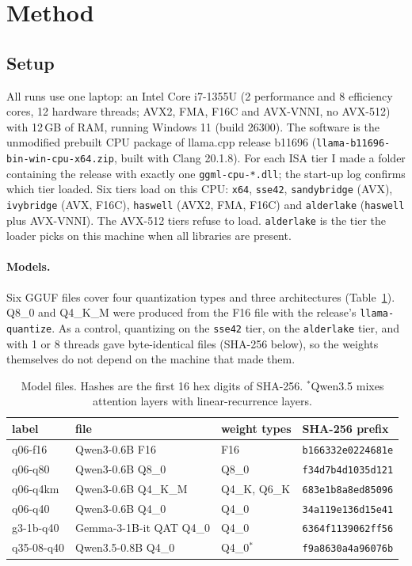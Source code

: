 \section{Method}
\label{sec:method}

\subsection{Setup}
All runs use one laptop: an Intel Core i7-1355U (2 performance and 8 efficiency cores, 12
hardware threads; AVX2, FMA, F16C and AVX-VNNI, no AVX-512) with 12\,GB of RAM, running Windows
11 (build 26300). The software is the unmodified prebuilt CPU package of llama.cpp release b11696
(\texttt{llama-b11696-bin-win-cpu-x64.zip}, built with Clang 20.1.8). For each ISA tier I made a
folder containing the release with exactly one \texttt{ggml-cpu-*.dll}; the start-up log
confirms which tier loaded. Six tiers load on this CPU: \texttt{x64}, \texttt{sse42},
\texttt{sandybridge} (AVX), \texttt{ivybridge} (AVX, F16C), \texttt{haswell} (AVX2, FMA, F16C)
and \texttt{alderlake} (\texttt{haswell} plus AVX-VNNI). The AVX-512 tiers refuse to load.
\texttt{alderlake} is the tier the loader picks on this machine when all libraries are present.

\paragraph{Models.}
Six GGUF files cover four quantization types and three architectures
(Table~\ref{tab:models}). Q8\_0 and Q4\_K\_M were produced from the F16 file with the release's
\texttt{llama-quantize}. As a control, quantizing on the \texttt{sse42} tier, on the
\texttt{alderlake} tier, and with 1 or 8 threads gave byte-identical files (SHA-256 below), so the
weights themselves do not depend on the machine that made them.

\begin{table}[t]
\centering\small
\caption{Model files. Hashes are the first 16 hex digits of SHA-256. $^{*}$Qwen3.5 mixes
attention layers with linear-recurrence layers.}
\label{tab:models}
\begin{tabular}{llll}
\toprule
label & file & weight types & SHA-256 prefix\\
\midrule
q06-f16   & Qwen3-0.6B F16 & F16 & \texttt{b166332e0224681e}\\
q06-q80   & Qwen3-0.6B Q8\_0 & Q8\_0 & \texttt{f34d7b4d1035d121}\\
q06-q4km  & Qwen3-0.6B Q4\_K\_M & Q4\_K, Q6\_K & \texttt{683e1b8a8ed85096}\\
q06-q40   & Qwen3-0.6B Q4\_0 & Q4\_0 & \texttt{34a119e136d15e41}\\
g3-1b-q40 & Gemma-3-1B-it QAT Q4\_0 & Q4\_0 & \texttt{6364f1139062ff56}\\
q35-08-q40 & Qwen3.5-0.8B Q4\_0 & Q4\_0$^{*}$ & \texttt{f9a8630a4a96076b}\\
\bottomrule
\end{tabular}
\end{table}

